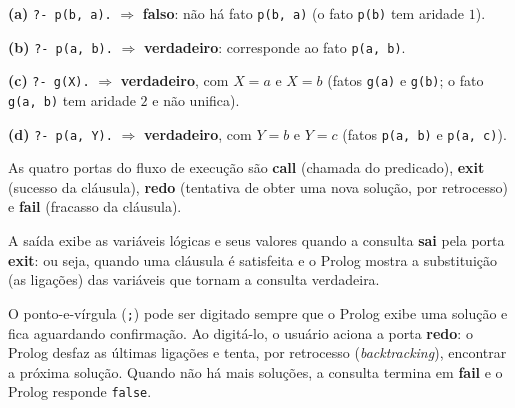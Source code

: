 
\begin{solution}
\textbf{(a)} \texttt{?- p(b, a).} $\Rightarrow$ \textbf{falso}: não há fato \texttt{p(b, a)} (o fato \texttt{p(b)} tem aridade $1$).

\textbf{(b)} \texttt{?- p(a, b).} $\Rightarrow$ \textbf{verdadeiro}: corresponde ao fato \texttt{p(a, b)}.

\textbf{(c)} \texttt{?- g(X).} $\Rightarrow$ \textbf{verdadeiro}, com $X = a$ e $X = b$ (fatos \texttt{g(a)} e \texttt{g(b)}; o fato \texttt{g(a, b)} tem aridade $2$ e não unifica).

\textbf{(d)} \texttt{?- p(a, Y).} $\Rightarrow$ \textbf{verdadeiro}, com $Y = b$ e $Y = c$ (fatos \texttt{p(a, b)} e \texttt{p(a, c)}).
\end{solution}


\begin{solution}
As quatro portas do fluxo de execução são \textbf{call} (chamada do predicado), \textbf{exit} (sucesso da cláusula), \textbf{redo} (tentativa de obter uma nova solução, por retrocesso) e \textbf{fail} (fracasso da cláusula).

A saída exibe as variáveis lógicas e seus valores quando a consulta \textbf{sai} pela porta \textbf{exit}: ou seja, quando uma cláusula é satisfeita e o Prolog mostra a substituição (as ligações) das variáveis que tornam a consulta verdadeira.

O ponto-e-vírgula (\texttt{;}) pode ser digitado sempre que o Prolog exibe uma solução e fica aguardando confirmação. Ao digitá-lo, o usuário aciona a porta \textbf{redo}: o Prolog desfaz as últimas ligações e tenta, por retrocesso (\textit{backtracking}), encontrar a próxima solução. Quando não há mais soluções, a consulta termina em \textbf{fail} e o Prolog responde \texttt{false}.
\end{solution}

